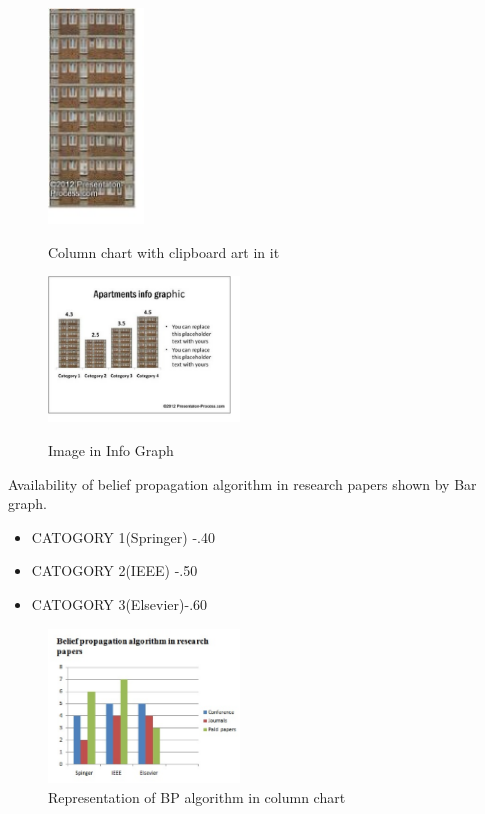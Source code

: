      \begin{figure}
  \includegraphics[width=1in]{figure3.eps}
  \caption {Column chart with clipboard art in it}\label{3.3} \cite {Anna and Bob}
\end{figure}




\begin{figure}
  \includegraphics[width=2in]{figure4.eps} \cite {Anna and Bob}
  \caption {Image in Info Graph}\label{3.4}
\end{figure}




Availability of belief propagation algorithm in research papers shown by Bar graph.

\begin{itemize}
  \item CATOGORY 1(Springer) -.40
  \item CATOGORY 2(IEEE) -.50
  \item CATOGORY 3(Elsevier)-.60
\end{itemize}

\begin{figure}
  \includegraphics[width=2in]{figure5.eps}
  \caption {Representation of BP algorithm in column chart}\label{3.5}
\end{figure}







